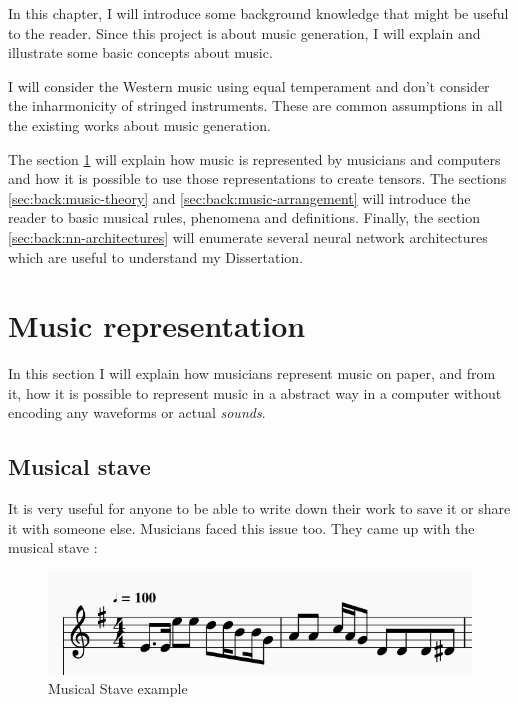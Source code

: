 \documentclass[12pt]{report}
\begin{document}
In this chapter, I will introduce some background knowledge that might be useful to the reader. Since this project is about music generation, I will explain and illustrate some basic concepts about music.

I will consider the Western music using equal temperament and don't consider the inharmonicity of stringed instruments. These are common assumptions in all the existing works about music generation.

The section \ref{sec:back:musical-representation} will explain how music is represented by musicians and computers and how it is possible to use those representations to create tensors.
The sections \ref{sec:back:music-theory} and \ref{sec:back:music-arrangement} will introduce the reader to basic musical rules, phenomena and definitions.
Finally, the section \ref{sec:back:nn-architectures} will enumerate several neural network architectures which are useful to understand my Dissertation.


\section{Music representation}
\label{sec:back:musical-representation}

In this section I will explain how musicians represent music on paper, and from it, how it is possible to represent music in a abstract way in a computer without encoding any waveforms or actual \textit{sounds}.

\subsection{Musical stave}

It is very useful for anyone to be able to write down their work to save it or share it with someone else. Musicians faced this issue too. They came up with the musical stave :

\begin{figure}[H]
    \centering
    \includegraphics[scale=0.75]{images/music/stave/musical_stave_example.jpg}
    \caption{Musical Stave example}
    \label{fig:musical_stave_example}
\end{figure}
\end{document}
